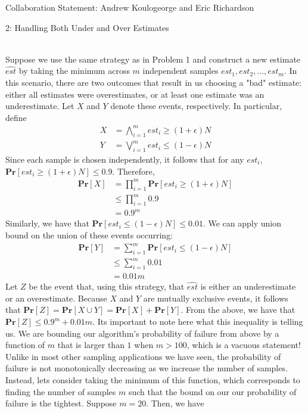 \documentclass[12pt]{article}
\begin{document}

Collaboration Statement: Andrew Koulogeorge and Eric Richardson 

\begin{problem}{2: Handling Both Under and Over Estimates}
\end{problem}

\begin{solution} \ \\
Suppose we use the same strategy as in Problem 1 and construct a new estimate $\hat{est}$ by taking the minimum across $m$ independent samples $est_1, est_2, ..., est_m$. In this scenario, there are two outcomes that result in us choosing a "bad" estimate: either all estimates were overestimates, or at least one estimate was an underestimate. Let $X$ and $Y$ denote these events, respectively. In particular, define 
\begin{align*}
    X &= \bigwedge\limits_{i=1}^m est_i \geq (1 + \epsilon)N \\
    Y &= \bigvee\limits_{i=1}^m est_i \leq (1 - \epsilon)N
\end{align*}
Since each sample is chosen independently, it follows that for any $est_i$, $\textbf{Pr}[est_i \geq (1 + \epsilon)N] \leq 0.9$. Therefore,
\begin{align*}
    \textbf{Pr}[X] &= \prod\limits_{i=1}^m \textbf{Pr}[est_i \geq (1 + \epsilon)N] \\
    &\leq \prod\limits_{i=1}^m 0.9 \\
    &= 0.9^m
\end{align*}
Similarly, we have that $\textbf{Pr}[est_i \leq (1 - \epsilon)N] \leq 0.01$. We can apply union bound on the union of these events occurring: 
\begin{align*}
    \textbf{Pr}[Y] &= \sum\limits_{i=1}^m \textbf{Pr}[est_i \leq (1 - \epsilon)N] \\ 
    &\leq \sum\limits_{i=1}^m 0.01 \\
    &= 0.01m
\end{align*}
Let $Z$ be the event that, using this strategy, that $\hat{{est}}$ is either an underestimate or an overestimate. Because $X$ and $Y$ are mutually exclusive events, it follows that $\textbf{Pr}[Z] = \textbf{Pr}[X\cup Y] = \textbf{Pr}[X] + \textbf{Pr}[Y]$. From the above, we have that $\textbf{Pr}[Z] \leq 0.9^m + 0.01m$. Its important to note here what this inequality is telling us. We are bounding our algorithm's probability of failure from above by a function of $m$ that is larger than $1$ when $m > 100$, which is a vacuous statement! Unlike in most other sampling applications we have seen, the probability of failure is not monotonically decreasing as we increase the number of samples. Instead, lets consider taking the minimum of this function, which corresponds to finding the number of samples $m$ such that the bound on our our probability of failure is the tightest. Suppose $m = 20$. Then, we have

\end{solution}
\end{document}
